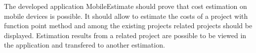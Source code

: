 The developed application MobileEstimate should prove that cost estimation on mobile devices is possible. It should allow to estimate the costs of a project with function point method and among the existing projects related projects should be displayed. Estimation results from a related project are possible to be viewed in the application and transfered to another estimation.\\
